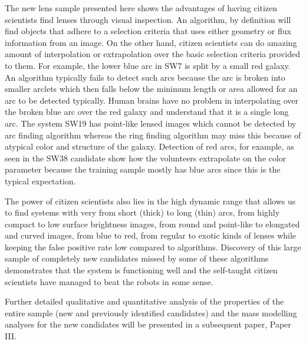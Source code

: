 \documentclass[useAMS,usenatbib,a4paper]{mn2e}
\begin{document}
The new \sw lens sample presented here shows the advantages of having
citizen scientists find lenses through visual inspection. An algorithm,
by definition will find objects that adhere to a selection criteria that
uses either geometry or flux information from an image. On the other
hand, citizen scientists can do amazing amount of interpolation or
extrapolation over the basic selection criteria provided to them.  For
example, the lower blue arc in SW7 is split by a small red galaxy.  An
algorithm typically fails to detect such arcs because the arc is broken
into smaller arclets which then falls below the minimum length or area
allowed for an arc to be detected typically. Human brains have no
problem in interpolating over the broken blue arc over the red galaxy
and understand that it is a single long arc. The system SW19 has
point-like lensed images which cannot be detected by arc finding
algorithm whereas the ring finding algorithm may miss this because of
atypical color and structure of the galaxy. Detection of red arcs, for
example, as seen in the SW38 candidate show how the volunteers
extrapolate on the color parameter because the training sample mostly
has blue arcs since this is the typical expectation.

The power of citizen scientists also lies in the high dynamic range that
allows us to find systems with very from short (thick) to long (thin)
arcs, from highly compact to low surface brightness images, from round
and point-like to elongated and curved images, from blue to red, from
regular to exotic kinds of lenses while keeping the false positive rate
low compared to algorithms. Discovery of this large sample of completely
new candidates missed by some of these algorithms demonstrates that the
\sw system is functioning well and the self-taught citizen scientists
have managed to beat the robots in some sense.

Further detailed qualitative and quantitative analysis of the properties
of the entire \sw sample (new and previously identified candidates) and
the mass modelling analyses for the new candidates will be presented in
a subsequent \sw paper, Paper III.



\end{document}
